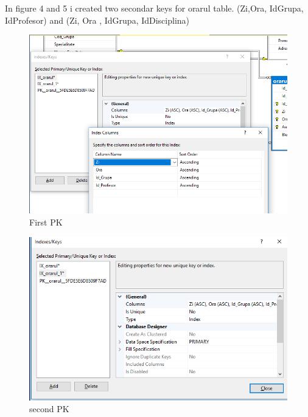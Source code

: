 \documentclass[12pt]{article}
\begin{document}
        In figure 4 and 5 i created two secondar keys for orarul table. (Zi,Ora, IdGrupa, IdProfesor) and (Zi, Ora , IdGrupa, IdDisciplina) 
        \begin{figure}[H]
                \centering
                \includegraphics[width=\textwidth]{img4a.png}
                \caption{First PK}
        \end{figure}
        \vspace{0.5 cm}

        \begin{figure}[H]
                \centering
                \includegraphics[width=\textwidth]{img4b.png}
                \caption{second PK}
        \end{figure}
        \vspace{0.5 cm}
\end{document}

